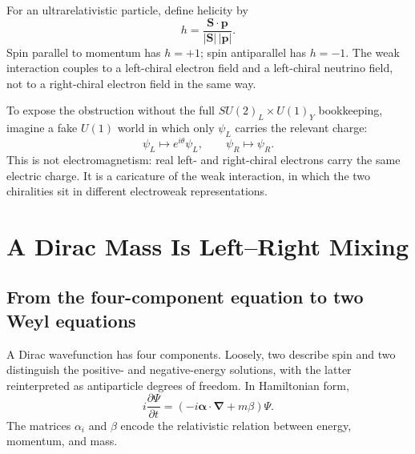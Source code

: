For an ultrarelativistic particle, define helicity by
\begin{equation}
  h=\frac{\bm S\cdot\bm p}{|\bm S|\,|\bm p|}.
\end{equation}
Spin parallel to momentum has \(h=+1\); spin antiparallel has \(h=-1\).
The weak interaction couples to a left-chiral electron field and a
left-chiral neutrino field, not to a right-chiral electron field in the same
way.

To expose the obstruction without the full
\(SU(2)_L\times U(1)_Y\) bookkeeping, imagine a fake \(U(1)\) world in which
only \(\psi_L\) carries the relevant charge:
\begin{equation}
  \psi_L\longmapsto e^{i\theta}\psi_L,
  \qquad
  \psi_R\longmapsto\psi_R .
  \label{eq:l09-chiral-toy-charge}
\end{equation}
This is not electromagnetism: real left- and right-chiral electrons carry
the same electric charge. It is a caricature of the weak interaction, in
which the two chiralities sit in different electroweak representations.

\begin{classroomqa}
\end{classroomqa}

\section{A Dirac Mass Is Left--Right Mixing}

\subsection{From the four-component equation to two Weyl equations}

A Dirac wavefunction has four components. Loosely, two describe spin and
two distinguish the positive- and negative-energy solutions, with the latter
reinterpreted as antiparticle degrees of freedom. In Hamiltonian form,
\begin{equation}
  i\frac{\partial\Psi}{\partial t}
  =\left(-i\bm\alpha\cdot\bm\nabla+m\beta\right)\Psi .
  \label{eq:l09-dirac-hamiltonian}
\end{equation}
The matrices \(\alpha_i\) and \(\beta\) encode the relativistic relation
between energy, momentum, and mass.

